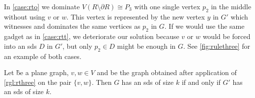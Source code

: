 In \cref{case:rto} we dominate $V(R \setminus \partial R) \cong P_3$ with one single vertex $p_2$ in the middle without using $v$ or $w$.
This vertex is represented by the new vertex $y$ in $G'$ which witnesses and dominates the same vertices as $p_2$ in $G$.
If we would use the same gadget as in \cref{case:rtt}, we deteriorate our solution because  $v$ or $w$ would be forced into an sds $D$ in $G'$, but only $p_2 \in D$ might be enough in $G$.
See \cref{fig:rulethree} for an example of both cases.

\begin{lemma}\label{lemma:correctnessthree}
    Let \G be a plane graph, $v, w \in V$ and \GB be the graph obtained after application of \cref{rgl:rthree} on the pair $\{v, w\}$. 
    Then $G$ has an sds of size $k$ if and only if $G'$ has an sds of size $k$.
\end{lemma}
